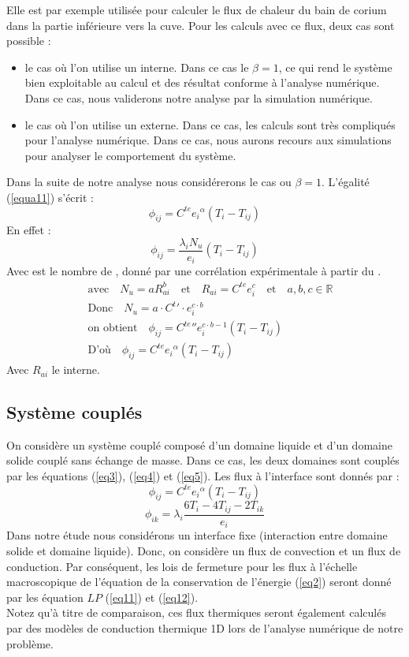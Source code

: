 \documentclass[11pt,a4paper]{scrartcl}%
\newcommand{\R}{\mathbb{R}}
\newcommand{\mtext}[1]{\quad\text{#1}\quad}%
\begin{document}
	Elle est par exemple utilisée pour calculer le flux de chaleur  du bain de corium dans la partie inférieure vers la cuve. Pour les calculs avec ce flux, deux cas sont possible :
	\begin{itemize}
		\item le cas où l'on utilise un  interne. Dans ce cas le $\beta = 1$, ce qui rend le système bien exploitable au calcul et des résultat conforme à l'analyse numérique. Dans ce cas, nous validerons notre analyse par la simulation numérique. 
		\item le cas où l'on utilise un  externe. Dans ce cas, les calculs sont très compliqués pour l'analyse numérique. Dans ce cas, nous aurons recours aux simulations pour analyser le comportement du système.
	\end{itemize}
	Dans la suite de notre analyse nous considérerons le cas ou $\beta = 1$. L'égalité (\ref{equa11}) s'écrit :
	\[
	\phi_{ij} = C^{te}{e_i}^{\alpha}(T_i - T_{ij})
	\]
	En effet :
	\begin{equation*}
		\phi_{ij} = \frac{\lambda_iN_u}{e_i}(T_i-T_{ij}) 
	\end{equation*}
	Avec  est le nombre de , donné par une corrélation expérimentale à partir du .
	\begin{gather*}
		\mtext{avec} N_u = aR_{ai}^b \mtext{et} R_{ai}= C^{te} e^c_i \mtext{et} a,b, c \in \R \\
		\mtext{Donc} N_u = a\cdot {C^{t}}'\cdot e^{c\cdot b}_i  \\
		\mtext{on obtient} \phi_{ij} = {C^{te}}''e^{c\cdot b-1}_i(T_i - T_{ij})\\
		\mtext{D'où} \phi_{ij} = C^{te}{e_i}^{\alpha}(T_i - T_{ij})
	\end{gather*}
	Avec $R_{ai}$ le  interne.
	\subsection{Système couplés}
	On considère un système couplé composé d'un domaine liquide et d'un domaine solide couplé sans échange de masse. Dans ce cas, les deux domaines sont couplés par les équations (\ref{eq3}), (\ref{eq4}) et (\ref{eq5}). Les flux à l'interface sont donnés par :
	\begin{equation}\label{eq11}
	\phi_{ij} = C^{te}{e_i}^{\alpha}(T_i - T_{ij})
	\end{equation}
	\begin{equation}\label{eq12}
	\phi_{ik} = \lambda_i\frac{6T_i - 4T_{ij} - 2T_{ik}}{ e_i}
	\end{equation}
	Dans notre étude nous considérons un interface fixe (interaction entre domaine solide et domaine liquide). Donc, on considère un flux de convection et un flux de conduction. Par conséquent, les lois de fermeture pour les flux à l'échelle macroscopique de l'équation de la conservation de l'énergie (\ref{eq2})  seront donné par les équation $LP$ (\ref{eq11}) et (\ref{eq12}).\\
	Notez qu'à titre de comparaison, ces flux thermiques seront également calculés par des modèles de conduction thermique 1D lors de l'analyse numérique de notre problème.
	\newpage
\end{document}
